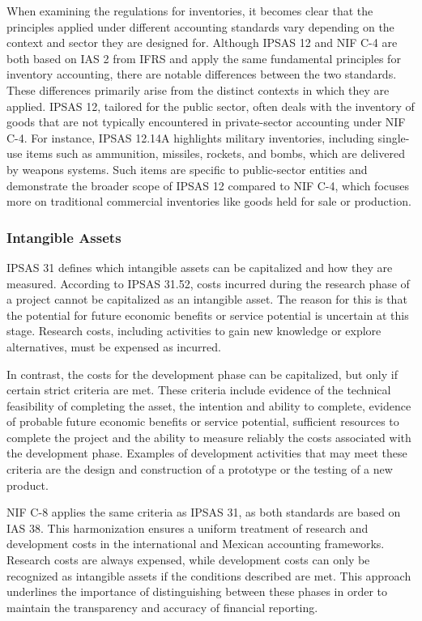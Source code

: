 \documentclass[10pt]{article}
\begin{document}
When examining the regulations for inventories, it becomes clear that the principles applied under different accounting standards vary depending on the context and sector they are designed for. Although IPSAS 12 and NIF C-4 are both based on IAS 2 from IFRS and apply the same fundamental principles for inventory accounting, there are notable differences between the two standards. These differences primarily arise from the distinct contexts in which they are applied. IPSAS 12, tailored for the public sector, often deals with the inventory of goods that are not typically encountered in private-sector accounting under NIF C-4. For instance, IPSAS 12.14A highlights military inventories, including single-use items such as ammunition, missiles, rockets, and bombs, which are delivered by weapons systems. Such items are specific to public-sector entities and demonstrate the broader scope of IPSAS 12 compared to NIF C-4, which focuses more on traditional commercial inventories like goods held for sale or production.

\subsubsection{Intangible Assets}\label{subsubsec:intangible_assets}
IPSAS 31 defines which intangible assets can be capitalized and how they are measured. According to IPSAS 31.52, costs incurred during the research phase of a project cannot be capitalized as an intangible asset. The reason for this is that the potential for future economic benefits or service potential is uncertain at this stage. Research costs, including activities to gain new knowledge or explore alternatives, must be expensed as incurred.

In contrast, the costs for the development phase can be capitalized, but only if certain strict criteria are met. These criteria include evidence of the technical feasibility of completing the asset, the intention and ability to complete, evidence of probable future economic benefits or service potential, sufficient resources to complete the project and the ability to measure reliably the costs associated with the development phase. Examples of development activities that may meet these criteria are the design and construction of a prototype or the testing of a new product.

NIF C-8 applies the same criteria as IPSAS 31, as both standards are based on IAS 38. This harmonization ensures a uniform treatment of research and development costs in the international and Mexican accounting frameworks. Research costs are always expensed, while development costs can only be recognized as intangible assets if the conditions described are met. This approach underlines the importance of distinguishing between these phases in order to maintain the transparency and accuracy of financial reporting.
\end{document}
